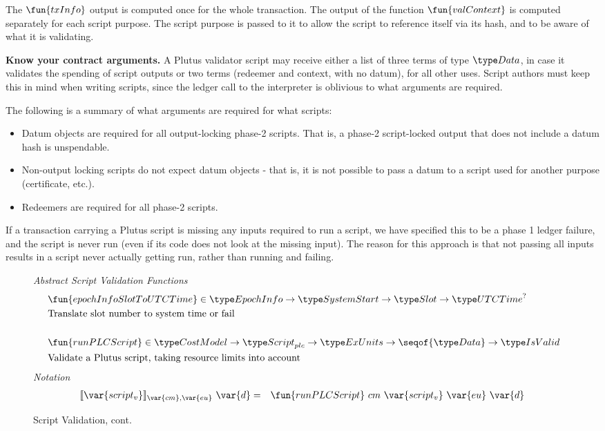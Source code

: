   The $\fun{txInfo}$ output is computed once for the whole transaction. The output of the function
  $\fun{valContext}$ is computed separately for each script purpose.
  The script purpose is passed to it
  to allow the script to reference itself via its hash, and to be aware of what it is validating.

\textbf{Know your contract arguments.}
  A Plutus validator script may receive either a list of three terms of type $\Data$, in case it validates the spending of script outputs
  or two terms (redeemer and context, with no datum), for all other uses.
  Script authors must keep this in mind when writing scripts, since the ledger call to the interpreter is oblivious to what
  arguments are required.

  The following is a summary of what arguments are required for what scripts:
  \begin{itemize}
    \item Datum objects are required for all output-locking phase-2 scripts. That is, a
    phase-2 script-locked output that does not include a datum hash is unspendable.
    \item Non-output locking scripts do not expect datum objects - that is, it is not possible to pass
    a datum to a script used for another purpose (certificate, etc.).
    \item Redeemers are required for all phase-2 scripts.
  \end{itemize}

   If a transaction carrying a Plutus script is missing any inputs required
   to run a script, we have specified this to be a phase 1
   ledger failure, and the script is never run (even if its code does not look at
   the missing input). The reason for this approach is that
   not passing all inputs results in a script never actually getting run,
   rather than running and failing.

\begin{figure*}[htb]
  \emph{Abstract Script Validation Functions}
  \begin{align*}
     &\fun{epochInfoSlotToUTCTime} \in \EpochInfo \to \SystemStart \to \Slot \to \UTCTime^? \\
     &\text{Translate slot number to system time or fail} \\~\\
     &\fun{runPLCScript} \in \CostMod \to \ScriptPlutus \to \ExUnits \to \seqof{\Data} \to
     \IsValid \\
     &\text{Validate a Plutus script, taking resource limits into account}
  \end{align*}
  \emph{Notation}
  \begin{align*}
    \llbracket \var{script_v} \rrbracket_{\var{cm},\var{eu}}~\var{d}
    &=& \fun{runPLCScript}~{cm} ~\var{script_v}~\var{eu}~\var{d}
  \end{align*}
  \caption{Script Validation, cont.}
  \label{fig:defs:functions-valid}
\end{figure*}

